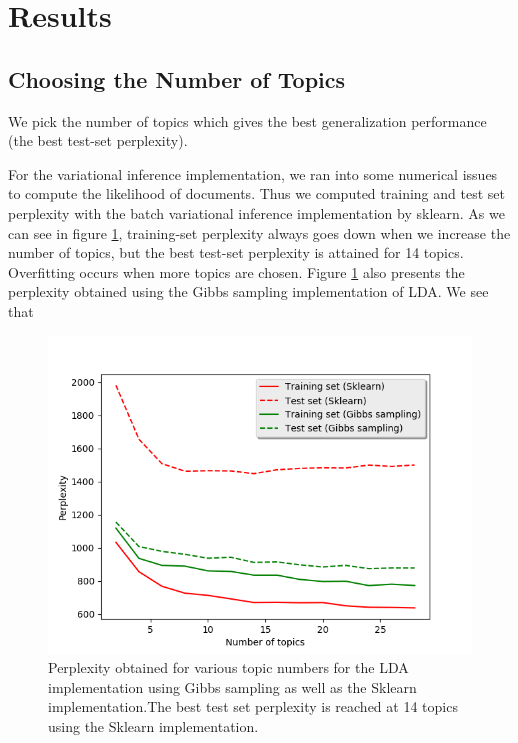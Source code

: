 \documentclass{article}
\begin{document}
\section{Results}

\subsection{Choosing the Number of Topics}
We pick the number of topics which gives the best generalization performance (the best test-set perplexity). 

For the variational inference implementation, we ran into some numerical issues to compute the likelihood of documents. Thus we computed training and test set perplexity with the batch variational inference implementation by sklearn. As we can see in figure \ref{perplexity}, training-set perplexity always goes down when we increase the number of topics, but the best test-set perplexity is attained for 14 topics. Overfitting occurs when more topics are chosen. Figure \ref{perplexity} also presents the perplexity obtained using the Gibbs sampling implementation of LDA. We see that 


\begin{figure}[ht]
\begin{center}
\centerline{\includegraphics[width=\columnwidth]{perplexity}}
\caption{Perplexity obtained for various topic numbers for the LDA implementation using Gibbs sampling as well as the Sklearn implementation.The best test set perplexity is reached at 14 topics using the Sklearn implementation.}
\label{perplexity}
\end{center}
\vskip -0.2in
\end{figure} 
\end{document}
